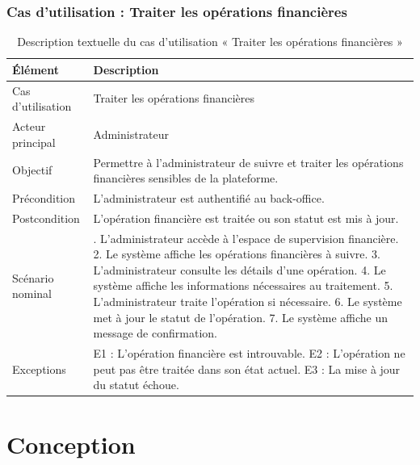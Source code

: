 \subsubsection{Cas d’utilisation : Traiter les opérations financières}


\begin{table}[H]
\centering
\caption{Description textuelle du cas d’utilisation « Traiter les opérations financières »}
\label{tableau:6-5}
\renewcommand{\arraystretch}{1.2}
\begin{tabularx}{\textwidth}{|>{\raggedright\arraybackslash}X|>{\raggedright\arraybackslash}X|}
\hline
\rowcolor[HTML]{ECF4FF}
\textbf{Élément} & \textbf{Description} \\
\hline
Cas d’utilisation & Traiter les opérations financières \\
\hline
Acteur principal & Administrateur \\
\hline
Objectif & Permettre à l’administrateur de suivre et traiter les opérations financières sensibles de la plateforme. \\
\hline
Précondition & L’administrateur est authentifié au back-office. \\
\hline
Postcondition & L’opération financière est traitée ou son statut est mis à jour. \\
\hline
Scénario nominal & 1. L’administrateur accède à l’espace de supervision financière.\newline{} 2. Le système affiche les opérations financières à suivre.\newline{} 3. L’administrateur consulte les détails d’une opération.\newline{} 4. Le système affiche les informations nécessaires au traitement.\newline{} 5. L’administrateur traite l’opération si nécessaire.\newline{} 6. Le système met à jour le statut de l’opération.\newline{} 7. Le système affiche un message de confirmation. \\
\hline
Exceptions & E1 : L’opération financière est introuvable.\newline{} E2 : L’opération ne peut pas être traitée dans son état actuel.\newline{} E3 : La mise à jour du statut échoue. \\
\hline
\end{tabularx}
\end{table}


\section{Conception}


